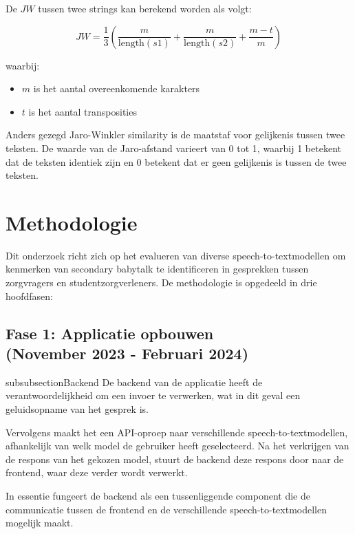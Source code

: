 De \(JW\) tussen twee strings kan berekend worden als volgt:

\[
JW = \frac{1}{3} \left( \frac{m}{\text{{length}}(s1)} + \frac{m}{\text{{length}}(s2)} + \frac{m - t}{m} \right)
\]

waarbij:
\begin{itemize}
    \item \(m\) is het aantal overeenkomende karakters
    \item \(t\) is het aantal transposities
\end{itemize}
Anders gezegd Jaro-Winkler similarity is de maatstaf voor gelijkenis tussen twee teksten. De waarde van de Jaro-afstand varieert van 0 tot 1, waarbij 1 betekent dat de teksten identiek zijn en 0 betekent dat er geen gelijkenis is tussen de twee teksten.


\section{Methodologie}%
\label{sec:methodologie}
Dit onderzoek richt zich op het evalueren van diverse speech-to-textmodellen om kenmerken van secondary babytalk te identificeren in gesprekken tussen zorgvragers en studentzorgverleners. De methodologie is opgedeeld in drie hoofdfasen:
\subsection{Fase 1: Applicatie opbouwen \\ (November 2023 - Februari 2024)}
subsubsection{Backend}
De backend van de applicatie heeft de verantwoordelijkheid om een invoer te verwerken, wat in dit geval een geluidsopname van het gesprek is.

Vervolgens maakt het een API-oproep naar verschillende speech-to-textmodellen, afhankelijk van welk model de gebruiker heeft geselecteerd. Na het verkrijgen van de respons van het gekozen model, stuurt de backend deze respons door naar de frontend, waar deze verder wordt verwerkt.

In essentie fungeert de backend als een tussenliggende component die de communicatie tussen de frontend en de verschillende speech-to-textmodellen mogelijk maakt.

